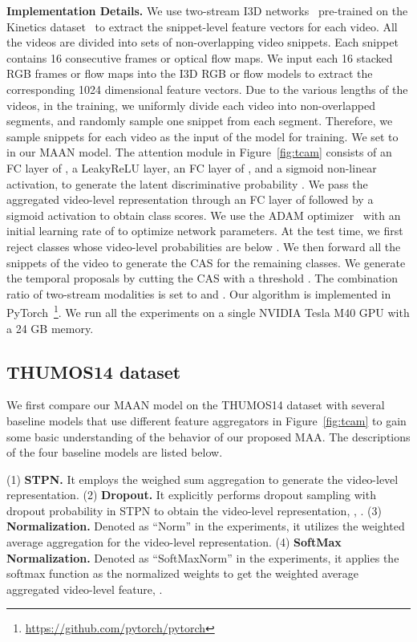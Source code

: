 \documentclass{article} \usepackage{iclr2019_conference,times}
\begin{document}
\textbf{Implementation Details.}
We use two-stream I3D networks~\citep{I3D} pre-trained on the Kinetics dataset~\citep{kinetics} to extract the snippet-level feature vectors for each video. 
All the videos are divided into sets of non-overlapping video snippets. Each snippet contains 16 consecutive frames or optical flow maps. We input each 16 stacked RGB frames or flow maps into the I3D RGB or flow models to extract the corresponding 1024 dimensional feature vectors. Due to the various lengths of the videos, in the training, we uniformly divide each video into  non-overlapped segments, and randomly sample one snippet from each segment. Therefore, we sample  snippets for each video as the input of the model for training. We set  to  in our MAAN model. The attention module in Figure~\ref{fig:tcam} consists of an FC layer of , a LeakyReLU layer, an FC layer of , and a sigmoid non-linear activation, to generate the latent discriminative probability . We pass the aggregated video-level representation through an FC layer of  followed by a sigmoid activation to obtain class scores. We use the ADAM optimizer~\citep{adam} with an initial learning rate of  to optimize network parameters. At the test time, we first reject classes whose video-level probabilities are below . We then forward all the snippets of the video to generate the CAS for the remaining classes. We generate the temporal proposals by cutting the CAS with a threshold . The combination ratio of two-stream modalities is set to  and . Our algorithm is implemented in PyTorch~\footnote{\url{https://github.com/pytorch/pytorch}}. We run all the experiments on a single NVIDIA Tesla M40 GPU with a 24 GB memory. 



\subsection{THUMOS14 dataset}
We first compare our MAAN model on the THUMOS14 dataset with several baseline models that use different feature aggregators in Figure~\ref{fig:tcam} to gain some basic understanding of the behavior of our proposed MAA. The descriptions of the four baseline models are listed below.


(1) \textbf{STPN.} It employs the weighed sum aggregation  to generate the video-level representation. (2) \textbf{Dropout.} It explicitly performs dropout sampling with dropout probability  in STPN to obtain the video-level representation, , . (3) \textbf{Normalization.} Denoted as ``Norm'' in the experiments, it utilizes the weighted average aggregation    for the video-level representation. (4) \textbf{SoftMax Normalization.} Denoted as ``SoftMaxNorm'' in the experiments, it applies the softmax function as the normalized weights to get the weighted average aggregated video-level feature,   . 
\end{document}
